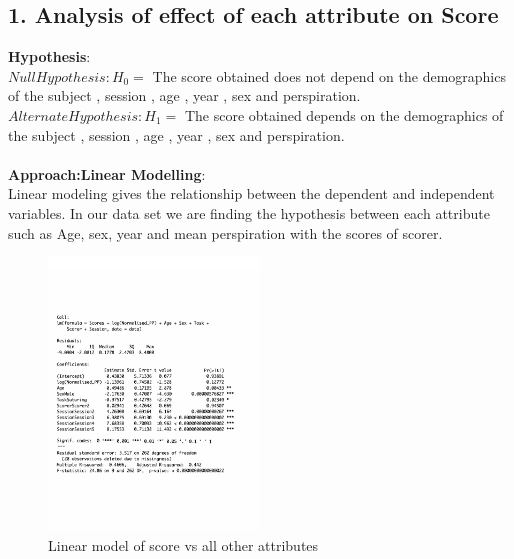 \documentclass[12pt,epsf]{report}
\begin{document}
\subsection*{1. Analysis of effect of each attribute on Score}
\textbf{Hypothesis}:\\
$Null Hypothesis : H_0 = $ The score obtained does not depend on the demographics of the subject , session , age , year , sex and perspiration.\\
$Alternate Hypothesis : H_1 = $ The score obtained  depends on the demographics of the subject , session , age , year , sex and perspiration.\\
\\
\textbf{Approach:Linear Modelling}:\\
Linear modeling gives the relationship between the dependent and independent variables. 
In our data set we are finding the hypothesis between each attribute such as Age, sex, year and mean perspiration with the scores of scorer.\\
\begin{figure}[!htb]
	\centering
	\includegraphics[width=0.5\textwidth]{ScoreSummary.pdf}
	\caption{Linear model of score vs all other attributes}
	\centering
\end{figure}
\\
\end{document}
